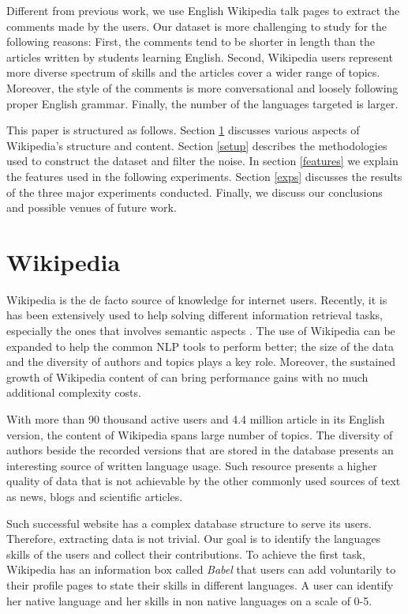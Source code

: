 \documentclass[10pt,a5paper,twoside]{article}
\begin{document}
Different from previous work, we use English Wikipedia talk pages to extract the comments made by the
users. Our dataset is more challenging to study for the following reasons:
First, the comments tend to be shorter in length than the articles written by
students learning English. Second, Wikipedia users represent more diverse
spectrum of skills and the articles cover a wider range of topics. Moreover, the
style of the comments is more conversational and loosely following proper English
grammar. Finally, the number of the languages targeted is larger.

This paper is structured as follows. Section \ref{wiki} discusses various
aspects of Wikipedia's structure and content. Section \ref{setup} describes
the methodologies used to construct the dataset and filter the noise. In section
\ref{features} we explain the features used in the following experiments.
Section \ref{exps} discusses the results of the three major experiments conducted.
Finally, we discuss our conclusions and possible venues of future work.

\section{Wikipedia}
\label{wiki}
Wikipedia is the de facto source of knowledge for internet users. Recently, it
is has been extensively used to help solving different information retrieval
tasks, especially the ones that involves semantic aspects \cite{Milne08aneffective}.
The use of Wikipedia can be expanded to help the
 common NLP tools to perform better; the size of the data and the diversity of
 authors and topics plays a key role. Moreover, the sustained growth of Wikipedia
 content of can bring performance gains with no much additional complexity costs.

With more than 90 thousand active users and 4.4 million article in its English
version, the content of Wikipedia spans large number of topics. The diversity
of authors beside the recorded versions that are stored in the database presents
an interesting source of written language usage. Such resource presents a higher quality of data that is not achievable by the other commonly used sources of text as news, blogs and scientific articles.

Such successful website has a complex database structure to serve its users.
Therefore, extracting data is not trivial. Our goal is to identify the
languages skills of the users and collect their contributions. To achieve the
first task, Wikipedia has an information box called \emph{Babel} that users can
add voluntarily to their profile pages to state their skills in different
languages. A user can identify her native language
and her skills in non native languages on a scale of 0-5.
\end{document}
